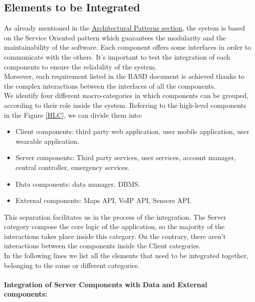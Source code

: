 \subsection{Elements to be Integrated}
As already mentioned in the \hyperlink{SOA_TG}{\underline{Architectural Patterns section}}, the system is based on the Service Oriented pattern which guarantees the modularity and the maintainability of the software. Each component offers some interfaces in order to communicate with the others.
It's important to test the integration of each components to ensure the reliability of the system. \\
Moreover, each requirement listed in the RASD document is achieved thanks to the complex interactions between the interfaces of all the components.\\
We identify four different macro-categories in which components can be grouped, according to their role inside the system.
Referring to the high-level components in the Figure \underline{\ref{HLC}}, we can divide them into:
\begin{itemize}
    \item Client components: third party web application, user mobile application, user wearable application.
    \item Server components: Third party services, user services, account manager, central controller, emergency services.
    \item Data components:  data manager, DBMS.
    \item External components: Maps API, VoIP API, Sensors API.
\end{itemize}
This separation facilitates us in the process of the integration. 
The Server category compose the core logic of the application, so the majority of the interactions takes place inside this category.
On the contrary, there aren't interactions between the components inside the Client categories.\\
In the following lines we list all the elements that need to be integrated together, belonging to the same or different categories.\\ \\
\textbf{Integration of Server Components with Data and External components:}
